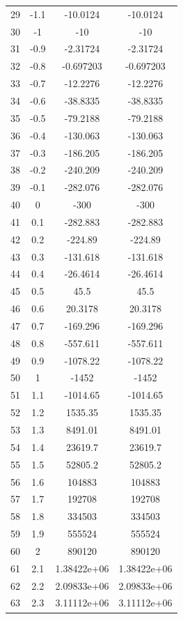 \documentclass{article} %
\begin{document}
\begin{center}
\begin{tabular}{|c|c|c|c|}
29 & -1.1 & -10.0124 & -10.0124\\
30 & -1 & -10 & -10\\
31 & -0.9 & -2.31724 & -2.31724\\
32 & -0.8 & -0.697203 & -0.697203\\
33 & -0.7 & -12.2276 & -12.2276\\
34 & -0.6 & -38.8335 & -38.8335\\
35 & -0.5 & -79.2188 & -79.2188\\
36 & -0.4 & -130.063 & -130.063\\
37 & -0.3 & -186.205 & -186.205\\
38 & -0.2 & -240.209 & -240.209\\
39 & -0.1 & -282.076 & -282.076\\
40 & 0 & -300 & -300\\
41 & 0.1 & -282.883 & -282.883\\
42 & 0.2 & -224.89 & -224.89\\
43 & 0.3 & -131.618 & -131.618\\
44 & 0.4 & -26.4614 & -26.4614\\
45 & 0.5 & 45.5 & 45.5\\
46 & 0.6 & 20.3178 & 20.3178\\
47 & 0.7 & -169.296 & -169.296\\
48 & 0.8 & -557.611 & -557.611\\
49 & 0.9 & -1078.22 & -1078.22\\
50 & 1 & -1452 & -1452\\
51 & 1.1 & -1014.65 & -1014.65\\
52 & 1.2 & 1535.35 & 1535.35\\
53 & 1.3 & 8491.01 & 8491.01\\
54 & 1.4 & 23619.7 & 23619.7\\
55 & 1.5 & 52805.2 & 52805.2\\
56 & 1.6 & 104883 & 104883\\
57 & 1.7 & 192708 & 192708\\
58 & 1.8 & 334503 & 334503\\
59 & 1.9 & 555524 & 555524\\
60 & 2 & 890120 & 890120\\
61 & 2.1 & 1.38422e+06 & 1.38422e+06\\
62 & 2.2 & 2.09833e+06 & 2.09833e+06\\
63 & 2.3 & 3.11112e+06 & 3.11112e+06\\

\end{tabular}
\end{center}
\end{document}
